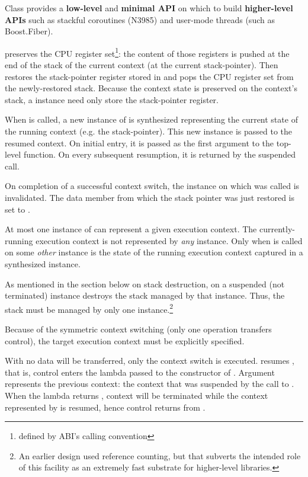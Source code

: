 Class \ectx provides a {\bfseries low-level} and {\bfseries minimal API} on
which to build {\bfseries higher-level APIs} such as stackful coroutines
(N3985\cite{N3985}) and user-mode threads (such as Boost.Fiber\cite{bfiber}).


\ectxop preserves the CPU register set\footnote{defined by ABI's calling
convention}: the content of those registers is pushed at the end of the stack
of the current context (at the current stack-pointer). Then \op restores the
stack-pointer register stored in  and pops the CPU register set
from the newly-restored stack.
Because the context state is preserved on the context's stack, a \ectx
instance need only store the stack-pointer register.


When \ectxop is called, a new instance of \ectx is synthesized representing
the current state of the running context (e.g. the stack-pointer). This new
instance is passed to the resumed context. On initial entry, it is passed as
the first argument to the top-level function. On every subsequent resumption,
it is returned by the suspended \op call.

On completion of a successful context switch, the
\ectx instance on which \op was called is invalidated. The data member from
which the stack pointer was just restored is set to .

At most one instance of \ectx can represent a given execution context. The
currently-running execution context is not represented by \emph{any} \ectx
instance. Only when \op is called on some \emph{other} \ectx instance is the
state of the running execution context captured in a synthesized \ectx
instance.

As mentioned in the section below on stack
destruction,  on a suspended (not terminated)
instance destroys the stack managed by that instance. Thus, the stack must be
managed by only one \ectx instance.\footnote{An earlier design used reference
counting, but that subverts the intended role of this facility as an extremely
fast substrate for higher-level libraries.}

Because of the symmetric context switching (only one operation transfers
control), the target execution context must be explicitly specified.

With  no data will be transferred, only the
context switch is executed.
 resumes , that is, control enters the lambda passed to
the constructor of . Argument  represents the previous
context: the context that was suspended by the call to . When the
lambda returns , context  will be terminated while the
context represented by  is resumed, hence control returns
from .\\


